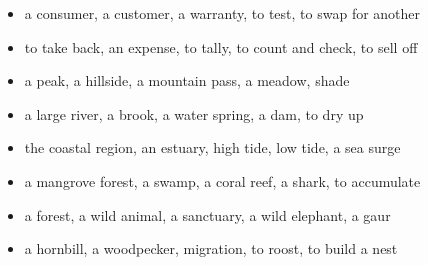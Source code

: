 \begin{itemize}
\raggedright
  \item a consumer, a customer, a warranty, to test, to swap for another
  \item to take back, an expense, to tally, to count and check, to sell off
  \item a peak, a hillside, a mountain pass, a meadow, shade
  \item a large river, a brook, a water spring, a dam, to dry up
  \item the coastal region, an estuary, high tide, low tide, a sea surge
  \item a mangrove forest, a swamp, a coral reef, a shark, to accumulate
  \item a forest, a wild animal, a sanctuary, a wild elephant, a gaur
  \item a hornbill, a woodpecker, migration, to roost, to build a nest
\end{itemize}

